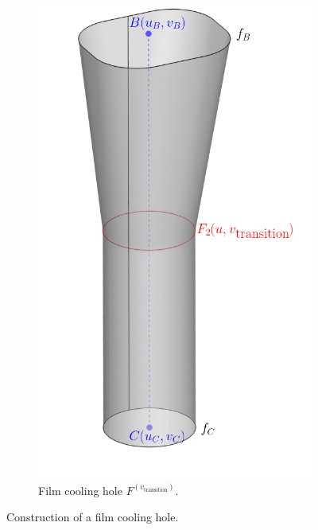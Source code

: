 \documentclass[a4paper, 11pt]{report}
\theoremstyle{definition}
\begin{document}
\begin{figure}[H]
\begin{subfigure}{.35\textwidth}
			\includegraphics[width=\textwidth]{../tec/holes/01edit.png}
			\caption{Film cooling hole $F^{(v_\textrm{transition})}$.}
		\end{subfigure}
		\caption{Construction of a film cooling hole.}
		\label{fig:filmcooling_construction}
	\end{figure}
\end{document}
